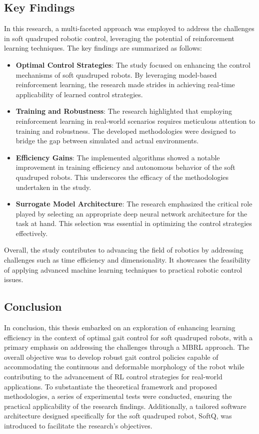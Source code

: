 \subsection{Key Findings}
In this research, a multi-faceted approach was employed to address the challenges in soft quadruped robotic control, leveraging the potential of reinforcement learning techniques. The key findings are summarized as follows:
\begin{itemize}
    \item \textbf{Optimal Control Strategies}: The study focused on enhancing the control mechanisms of soft quadruped robots. By leveraging model-based reinforcement learning, the research made strides in achieving real-time applicability of learned control strategies.
    \item \textbf{Training and Robustness}: The research highlighted that employing reinforcement learning in real-world scenarios requires meticulous attention to training and robustness. The developed methodologies were designed to bridge the gap between simulated and actual environments.
    \item \textbf{Efficiency Gains}: The implemented algorithms showed a notable improvement in training efficiency and autonomous behavior of the soft quadruped robots. This underscores the efficacy of the methodologies undertaken in the study.
    \item \textbf{Surrogate Model Architecture}: The research emphasized the critical role played by selecting an appropriate deep neural network architecture for the task at hand. This selection was essential in optimizing the control strategies effectively.
\end{itemize}
Overall, the study contributes to advancing the field of robotics by addressing challenges such as time efficiency and dimensionality. It showcases the feasibility of applying advanced machine learning techniques to practical robotic control issues.

\subsection{Conclusion}
In conclusion, this thesis embarked on an exploration of enhancing learning efficiency in the context of optimal gait control for soft quadruped robots, with a primary emphasis on addressing the challenges through a MBRL approach. The overall objective was to develop robust gait control policies capable of accommodating the continuous and deformable morphology of the robot while contributing to the advancement of RL control strategies for real-world applications. To substantiate the theoretical framework and proposed methodologies, a series of experimental tests were conducted, ensuring the practical applicability of the research findings. Additionally, a tailored software architecture designed specifically for the soft quadruped robot, SoftQ, was introduced to facilitate the research's objectives.

